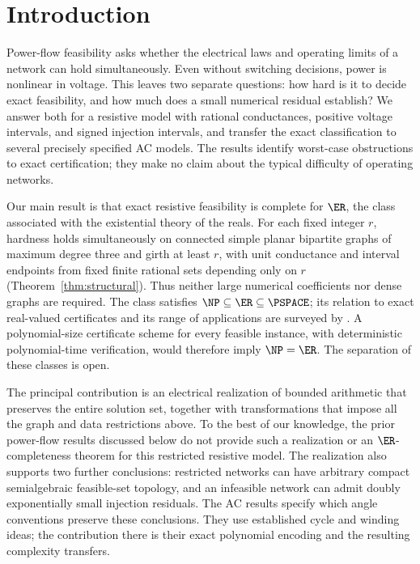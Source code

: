 \section{Introduction}
\label{sec:introduction}

Power-flow feasibility asks whether the electrical laws and operating limits
of a network can hold simultaneously. Even without switching decisions,
power is nonlinear in voltage. This leaves two separate questions: how hard
is it to decide exact feasibility, and how much does a small numerical
residual establish? We answer both for a resistive model with rational
conductances, positive voltage intervals, and signed injection intervals,
and transfer the exact classification to several precisely specified AC
models. The results identify worst-case obstructions to exact certification;
they make no claim about the typical difficulty of operating networks.

Our main result is that exact resistive feasibility is complete for
$\ER$, the class associated with the existential theory of the reals.
For each fixed integer $r$, hardness holds simultaneously on connected
simple planar bipartite graphs of maximum degree three and girth at least
$r$, with unit conductance and interval endpoints from fixed finite rational
sets depending only on $r$ (Theorem~\ref{thm:structural}). Thus neither
large numerical coefficients nor dense graphs are required. The class
satisfies $\NP\subseteq\ER\subseteq\PSPACE$; its relation to exact
real-valued certificates and its range of applications are surveyed by
\citet{SchaeferEtAl2024}. A polynomial-size certificate scheme for every
feasible instance, with deterministic polynomial-time verification, would
therefore imply $\NP=\ER$. The separation of these classes is open.

The principal contribution is an electrical realization of bounded arithmetic
that preserves the entire solution set, together with transformations that
impose all the graph and data restrictions above. To the best of our
knowledge, the prior power-flow results discussed below do not provide such
a realization or an $\ER$-completeness theorem for this restricted resistive
model. The realization also supports two further conclusions: restricted
networks can have arbitrary compact semialgebraic feasible-set topology, and
an infeasible network can admit doubly exponentially small injection
residuals. The AC results specify which angle conventions preserve these
conclusions. They use established cycle and winding ideas; the contribution
there is their exact polynomial encoding and the resulting complexity
transfers.

